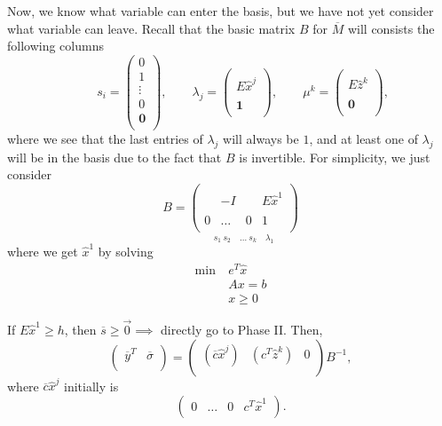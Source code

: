 Now, we know what variable can enter the basis, but we have not yet consider what variable can leave. Recall that the basic matrix \(B\) for \(\overline{M}\) will consists
the following columns
\[
	\qquad s_{i} = \begin{pmatrix}
		0      \\
		1      \\
		\vdots \\
		0      \\
		\bm{0} \\
	\end{pmatrix}, \qquad \lambda_{j} = \begin{pmatrix}
		\\
		E \hat{x}^j \\
		\\
		\bm{1}      \\
	\end{pmatrix}, \qquad \mu^k =\begin{pmatrix}
		\\
		E \hat{z}^k \\
		\\
		\bm{0}      \\
	\end{pmatrix},
\]
where we see that the last entries of \(\lambda_{j}\) will always be \(1\), and at least one of \(\lambda_{j}\) will be in the basis due to the fact that \(B\) is invertible.
For simplicity, we just consider
\[
	B = \underset{s_1\ s_2\quad \ldots\ s_k\quad \lambda_1}{
		\begin{pmatrix}
			  &        &   &             \\
			  & -I     &   & E \hat{x}^1 \\
			  &        &   &             \\
			0 & \ldots & 0 & 1           \\
		\end{pmatrix}}
\]
where we get \(\hat{x}^1\) by solving
\begin{align*}
	\min~ & e^{T}\hat{x} \\
	      & Ax = b       \\
	      & x\geq 0
\end{align*}

If \(E \hat{x}^1\geq h\), then \(\overline{s}\geq \vec{0}\implies\) directly go to Phase II. Then,
\[
	\begin{pmatrix}
		\overline{y}^{T} & \overline{\sigma} \\
	\end{pmatrix} = \begin{pmatrix}
		(\overline{c}\hat{x}^j) & (c^{T}\hat{z}^k) & 0 \\
	\end{pmatrix}B^{-1},
\]
where \(\overline{c}\hat{x}^j\) initially is
\[
	\begin{pmatrix}
		0 & \ldots & 0 & c^{T}\hat{x}^1 \\
	\end{pmatrix}.
\]

